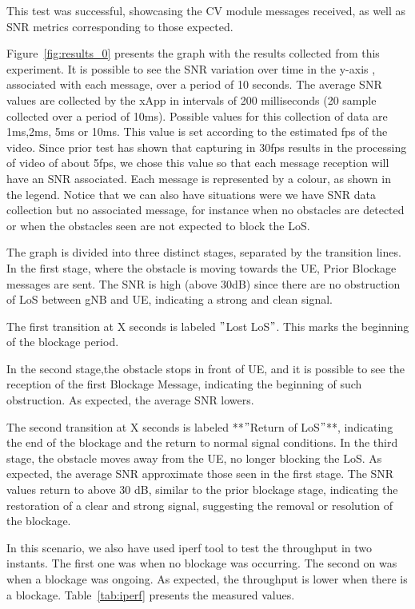 This test was successful, showcasing the CV module messages received, as well as SNR metrics corresponding to those expected.

Figure~\ref{fig:results_0} presents the graph with the results collected from this experiment.
It is possible to see the SNR variation over time in the y-axis , associated with each message, over a period of 10 seconds.
The average SNR values are collected by the xApp in intervals of 200 milliseconds (20 sample collected over a period of 10ms).
Possible values for this collection of data are 1ms,2ms, 5ms or 10ms.
This value is set according to the estimated fps of the video.
Since prior test has shown that capturing in 30fps results in the processing of video of about 5fps, we chose this value so that each message reception will have an SNR associated.
Each message is represented by a colour, as shown in the legend.
Notice that we can also have situations were we have SNR data collection but no associated message, for instance when no obstacles are detected or when the obstacles seen are not expected to block the LoS\@.

The graph is divided into three distinct stages, separated by the transition lines.
In the first stage, where the obstacle is moving towards the UE, Prior Blockage messages are sent.
The SNR is high (above 30dB) since there are no obstruction of LoS between gNB and UE, indicating a strong and clean signal.

The first transition at X seconds is labeled \("\)Lost LoS\("\).
This marks the beginning of the blockage period.

In the second stage,the obstacle stops in front of UE,
and it is possible to see the reception of the first Blockage Message, indicating the beginning of such obstruction.
As expected, the average SNR lowers.

The second transition at X seconds is labeled **\("\)Return of LoS\("\)**, indicating the end of the blockage and the return to normal signal conditions.
In the third stage, the obstacle moves away from the UE, no longer blocking the LoS\@.
As expected, the average SNR approximate those seen in the first stage.
The SNR values return to above 30 dB, similar to the prior blockage stage, indicating the restoration of a clear and strong signal, suggesting the removal or resolution of the blockage.

In this scenario, we also have used iperf tool to test the throughput in two instants.
The first one was when no blockage was occurring.
The second on was when a blockage was ongoing.
As expected, the throughput is lower when there is a blockage.
Table~\ref{tab:iperf} presents the measured values.


